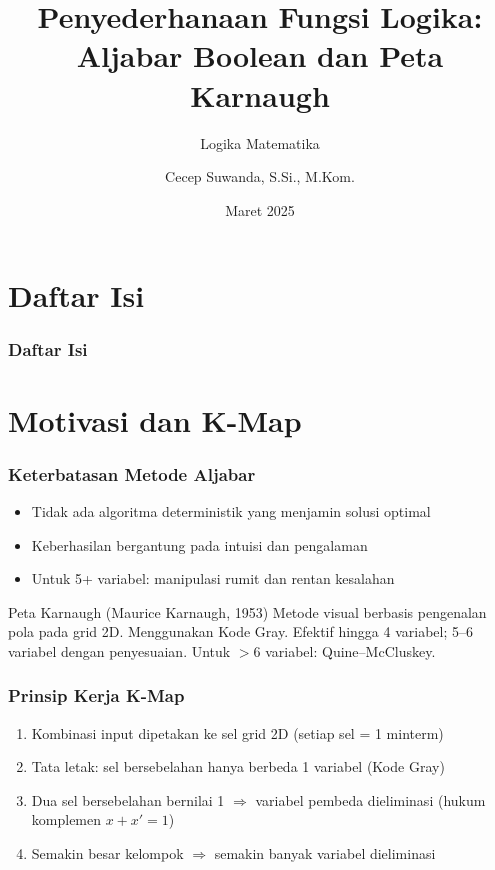 \documentclass[handout]{beamer}
\subtitle[Logika Matematika]{Logika Matematika}
\title[Peta Karnaugh]{Penyederhanaan Fungsi Logika: Aljabar Boolean dan Peta Karnaugh}
\author{Cecep Suwanda, S.Si., M.Kom.}
\date{Maret 2025}
\institute{Universitas Bale Bandung}
\theoremstyle{definition}
\theoremstyle{example}
\begin{document}
\maketitle

\section*{Daftar Isi}
\begin{frame}
\frametitle{Daftar Isi}
\tableofcontents
\end{frame}

\section{Motivasi dan K-Map}

\begin{frame}
\frametitle{Keterbatasan Metode Aljabar}
\begin{itemize}
  \item Tidak ada algoritma deterministik yang menjamin solusi optimal
  \item Keberhasilan bergantung pada intuisi dan pengalaman
  \item Untuk 5+ variabel: manipulasi rumit dan rentan kesalahan
\end{itemize}
\begin{block}{Peta Karnaugh (Maurice Karnaugh, 1953)}
Metode visual berbasis pengenalan pola pada grid 2D. Menggunakan Kode Gray. Efektif hingga 4 variabel; 5--6 variabel dengan penyesuaian. Untuk $>$6 variabel: Quine--McCluskey.
\end{block}
\end{frame}

\begin{frame}
\frametitle{Prinsip Kerja K-Map}
\begin{enumerate}
  \item Kombinasi input dipetakan ke sel grid 2D (setiap sel = 1 minterm)
  \item Tata letak: sel bersebelahan hanya berbeda 1 variabel (Kode Gray)
  \item Dua sel bersebelahan bernilai 1 $\Rightarrow$ variabel pembeda dieliminasi (hukum komplemen $x+x'=1$)
  \item Semakin besar kelompok $\Rightarrow$ semakin banyak variabel dieliminasi
\end{enumerate}
\end{frame}
\end{document}
